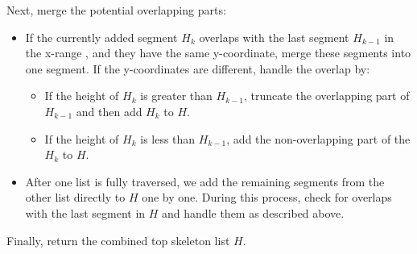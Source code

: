 \documentclass[12pt]{article}
\begin{document}
        Next, merge the potential overlapping parts:
        \begin{itemize}
            \item If the currently added segment \( H_k \) overlaps with the last segment \( H_{k-1} \) in the x-range , and they have the same y-coordinate, merge these segments into one segment. If the y-coordinates are different, handle the overlap by:

            \begin{itemize}
                \item If the height of \( H_k \) is greater than \( H_{k-1} \), truncate the overlapping part of \( H_{k-1} \) and then add \( H_k \) to \( H \).
                \item If the height of \( H_k \) is less than \( H_{k-1} \), add the non-overlapping part of the \( H_k \) to \( H \).
            \end{itemize}

            \item After one list is fully traversed, we add the remaining segments from the other list directly to \( H \) one by one. During this process, check for overlaps with the last segment in \( H \) and handle them as described above.

        \end{itemize}

        Finally, return the combined top skeleton list $H$.
\end{document}
